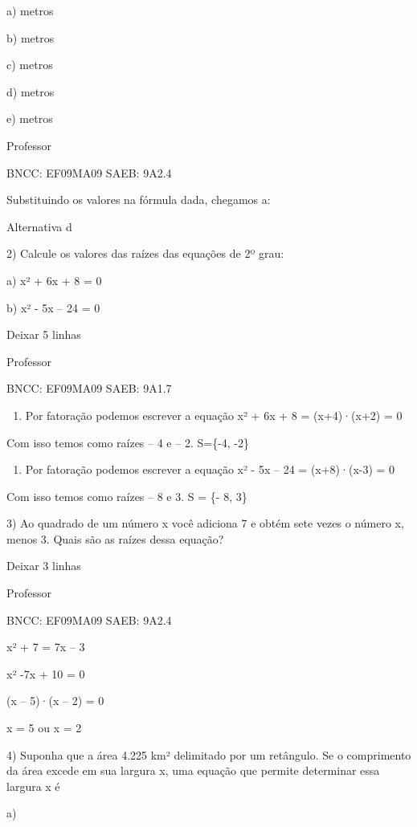 \begin{escolha}
{{{\begin{escolha}
{a) metros

b) metros

c) metros

d) metros

e) metros

Professor

BNCC: EF09MA09 SAEB: 9A2.4

Substituindo os valores na fórmula dada, chegamos a:

Alternativa d

2) Calcule os valores das raízes das equações de 2º grau:

a) x² + 6x + 8 = 0

b) x² - 5x -- 24 = 0

Deixar 5 linhas

Professor

BNCC: EF09MA09 SAEB: 9A1.7

\begin{enumerate}
\def\labelenumi{\alph{enumi}.}
\setcounter{enumi}{4}
\tightlist
\item
  Por fatoração podemos escrever a equação x² + 6x + 8 = (x+4)·(x+2) = 0
\end{enumerate}

Com isso temos como raízes -- 4 e -- 2. S=\{-4, -2\}

\begin{enumerate}
\def\labelenumi{\alph{enumi}.}
\setcounter{enumi}{5}
\tightlist
\item
  Por fatoração podemos escrever a equação x² - 5x -- 24 = (x+8)·(x-3) =
  0
\end{enumerate}

Com isso temos como raízes -- 8 e 3. S = \{- 8, 3\}

3) Ao quadrado de um número x você adiciona 7 e obtém sete vezes o
número x, menos 3. Quais são as raízes dessa equação?

Deixar 3 linhas

Professor

BNCC: EF09MA09 SAEB: 9A2.4

x² + 7 = 7x -- 3

x² -7x + 10 = 0

(x -- 5)·(x -- 2) = 0

x = 5 ou x = 2

4) Suponha que a área 4.225 km² delimitado por um retângulo. Se o
comprimento da área excede em sua largura x, uma equação que permite
determinar essa largura x é

a)

}
\end{escolha}}}}
\end{escolha}
